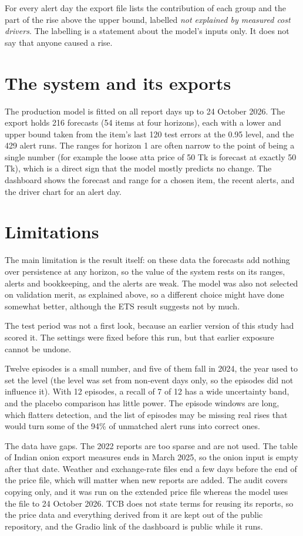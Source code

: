 \documentclass[12pt]{report}
\newcommand{\unexpl}{\emph{not explained by measured cost drivers}}
\begin{document}
For every alert day the export file lists the contribution of each group and the part of the rise above the upper bound, labelled \unexpl. The labelling is a statement about the model's inputs only. It does not say that anyone caused a rise.

\section{The system and its exports}
The production model is fitted on all report days up to 24 October 2026. The export holds 216 forecasts (54 items at four horizons), each with a lower and upper bound taken from the item's last 120 test errors at the 0.95 level, and the 429 alert runs. The ranges for horizon 1 are often narrow to the point of being a single number (for example the loose atta price of 50 Tk is forecast at exactly 50 Tk), which is a direct sign that the model mostly predicts no change. The dashboard shows the forecast and range for a chosen item, the recent alerts, and the driver chart for an alert day.

\section{Limitations}
The main limitation is the result itself: on these data the forecasts add nothing over persistence at any horizon, so the value of the system rests on its ranges, alerts and bookkeeping, and the alerts are weak. The model was also not selected on validation merit, as explained above, so a different choice might have done somewhat better, although the ETS result suggests not by much.

The test period was not a first look, because an earlier version of this study had scored it. The settings were fixed before this run, but that earlier exposure cannot be undone.

Twelve episodes is a small number, and five of them fall in 2024, the year used to set the level (the level was set from non-event days only, so the episodes did not influence it). With 12 episodes, a recall of 7 of 12 has a wide uncertainty band, and the placebo comparison has little power. The episode windows are long, which flatters detection, and the list of episodes may be missing real rises that would turn some of the 94\% of unmatched alert runs into correct ones.

The data have gaps. The 2022 reports are too sparse and are not used. The table of Indian onion export measures ends in March 2025, so the onion input is empty after that date. Weather and exchange-rate files end a few days before the end of the price file, which will matter when new reports are added. The audit covers copying only, and it was run on the extended price file whereas the model uses the file to 24 October 2026. TCB does not state terms for reusing its reports, so the price data and everything derived from it are kept out of the public repository, and the Gradio link of the dashboard is public while it runs.
\end{document}
